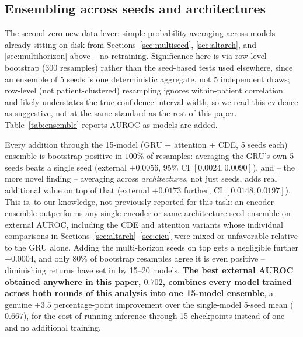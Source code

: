 \documentclass[11pt]{article}
\begin{document}
\subsection{Ensembling across seeds and architectures}
\label{sec:ensemble}
The second zero-new-data lever: simple probability-averaging across models already sitting on disk from Sections~\ref{sec:multiseed}, \ref{sec:altarch}, and \ref{sec:multihorizon} above -- no retraining. Significance here is via row-level bootstrap (300 resamples) rather than the seed-based tests used elsewhere, since an ensemble of 5 seeds is one deterministic aggregate, not 5 independent draws; row-level (not patient-clustered) resampling ignores within-patient correlation and likely understates the true confidence interval width, so we read this evidence as suggestive, not at the same standard as the rest of this paper. Table~\ref{tab:ensemble} reports AUROC as models are added.

\begin{table}[t]
\centering
\caption{Probability-averaging ensembles of already-trained checkpoints, no retraining. Each row adds the previous row's models plus one more architecture or seed group.}
\label{tab:ensemble}

\end{table}

Every addition through the 15-model (GRU + attention + CDE, 5 seeds each) ensemble is bootstrap-positive in $100\%$ of resamples: averaging the GRU's own 5 seeds beats a single seed (external $+0.0056$, 95\% CI $[0.0024, 0.0090]$), and -- the more novel finding -- averaging across \emph{architectures}, not just seeds, adds real additional value on top of that (external $+0.0173$ further, CI $[0.0148, 0.0197]$). This is, to our knowledge, not previously reported for this task: an encoder ensemble outperforms any single encoder or same-architecture seed ensemble on external AUROC, including the CDE and attention variants whose individual comparisons in Sections~\ref{sec:altarch}--\ref{sec:eicu} were mixed or unfavorable relative to the GRU alone. Adding the multi-horizon seeds on top gets a negligible further $+0.0004$, and only $80\%$ of bootstrap resamples agree it is even positive -- diminishing returns have set in by 15--20 models. \textbf{The best external AUROC obtained anywhere in this paper, $0.702$, combines every model trained across both rounds of this analysis into one 15-model ensemble}, a genuine $+3.5$ percentage-point improvement over the single-model 5-seed mean ($0.667$), for the cost of running inference through 15 checkpoints instead of one and no additional training.
\end{document}
